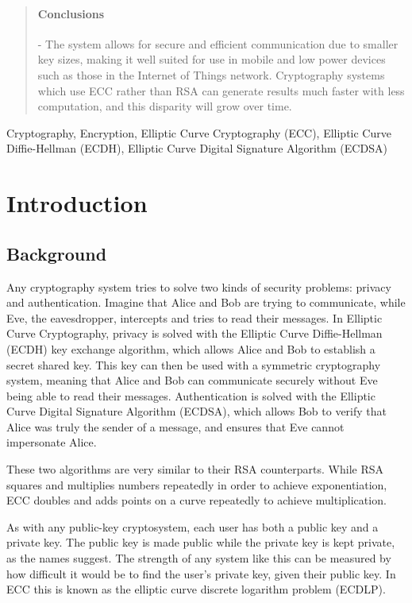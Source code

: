 \documentclass[12pt,a4paper]{article}
\begin{document}
\begin{abstract}
    \vspace{-5mm}
    \paragraph{Conclusions} -
    The system allows for secure and efficient communication due to smaller key sizes, making it well suited for use in mobile and low power devices such as those in the Internet of Things network. 
    Cryptography systems which use ECC rather than RSA can generate results much faster with less computation, and this disparity will grow over time. 

\end{abstract}


\begin{keywords}
Cryptography, Encryption, Elliptic Curve Cryptography (ECC), Elliptic Curve Diffie-Hellman (ECDH), 
Elliptic Curve Digital Signature Algorithm (ECDSA)
\end{keywords}


\section{Introduction} \noindent
\subsection{Background} \noindent
Any cryptography system tries to solve two kinds of security problems: privacy and authentication. 
Imagine that Alice and Bob are trying to communicate, while Eve, the eavesdropper, intercepts and tries to read their messages. 
In Elliptic Curve Cryptography, privacy is solved with the Elliptic Curve Diffie-Hellman (ECDH) key exchange algorithm, 
which allows Alice and Bob to establish a secret shared key. 
This key can then be used with a symmetric cryptography system, meaning that Alice and Bob can communicate securely without Eve being able to read their messages. 
Authentication is solved with the Elliptic Curve Digital Signature Algorithm (ECDSA), 
which allows Bob to verify that Alice was truly the sender of a message, and ensures that Eve cannot impersonate Alice. 

These two algorithms are very similar to their RSA counterparts. 
While RSA squares and multiplies numbers repeatedly in order to achieve exponentiation, 
ECC doubles and adds points on a curve repeatedly to achieve multiplication. 

As with any public-key cryptosystem, each user has both a public key and a private key. 
The public key is made public while the private key is kept private, as the names suggest. 
The strength of any system like this can be measured by how difficult it would be to find the user's private key, given their public key. 
In ECC this is known as the elliptic curve discrete logarithm problem (ECDLP). 
\end{document}
